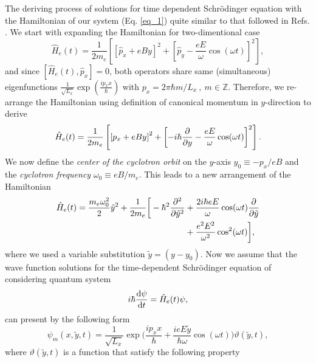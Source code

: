The deriving process of solutions for time dependent Schrödinger equation with the Hamiltonian of our system (Eq. \ref{eq_1}) quite similar to that followed in Refs. \cite{husimi53,dini16}. We start with expanding the Hamiltonian for two-dimentional case
\begin{equation} \label{eq_a1}
  \hat{H}_e(t) = \frac{1}{2m_e}\left[
    \left[\hat{p}_x + eBy \right]^2 +
    \left[\hat{p}_y - \frac{eE}{\omega}\cos(\omega t)\right]^2
  \right],
\end{equation}
and since $\left[\hat{H}_e(t),\hat{p}_x \right] =0$, both operators share same (simultaneous) eigenfunctions
$\frac{1}{\sqrt{L_x}}\exp(\frac{ip_x x}{\hbar})$ with $p_x = 2\pi \hbar m/L_x~,~ m \in \mathbb{Z}$.
Therefore, we re-arrange the Hamiltonian using definition of canonical momentum in $y$-direction to derive
\begin{equation} \label{eq_a2}
    \hat{H}_e(t) = \frac{1}{2m_e}\left[
      \left[{p}_x + eBy \right]^2 +
      \left[-i\hbar \pdv{y}- \frac{eE}{\omega}\cos(\omega t)\right]^2
    \right].
\end{equation}
We now define the \textit{center of the cyclotron orbit} on the $y$-axis $y_0 \equiv {-p_x}/{eB}$ and the \textit{cyclotron frequency} $\omega_0 \equiv {eB}/{m_e}$. This leads to a new arrangement of the Hamiltonian
\begin{equation} \label{eq_a3}
  \begin{aligned}
    \hat{H}_e(t) =
      \frac{m_e \omega_0^2}{2}\tilde{y}^2 +
      \frac{1}{2m_e}\bigg[
      -\hbar^2 \pdv[2]{\tilde{y}} & +
      \frac{2i\hbar eE}{\omega}\cos(\omega t) \pdv{\tilde{y}} \\
      & +
      \frac{e^2E^2}{\omega^2}\cos[2](\omega t)
      \bigg],
  \end{aligned}
\end{equation}
where we used a variable substitution $\tilde{y} = (y - y_0)$. Now we assume that the wave function solutions for the time-dependent Schrödinger equation of considering quantum system
\begin{equation} \label{eq_a4}
    i \hbar \dv{\psi}{t} = \hat{H}_e(t)\psi,
\end{equation}
can present by the following form
\begin{equation} \label{eq_a5}
    \psi_m(x,\tilde{y},t) = \frac{1}{\sqrt{L_x}} \exp\bigg(
      \frac{ip_x x}{\hbar} +
      \frac{ieE\tilde{y}}{\hbar \omega}\cos(\omega t)
    \bigg) \vartheta(\tilde{y},t),
\end{equation}
where $\vartheta(\tilde{y},t)$ is a function that satisfy the following property
